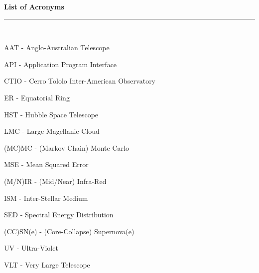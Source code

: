 \thispagestyle{empty}
\begin{raggedleft}
\vspace*{23mm}
\hfill {\huge {\bf {List of Acronyms}}} \\
\vspace{6mm}
\hfill \rule{4in}{.015in} \\
\vspace{19mm}
\end{raggedleft}




%
%

AAT - Anglo-Australian Telescope

API - Application Program Interface

CTIO - Cerro Tololo Inter-American Observatory

ER - Equatorial Ring

HST - Hubble Space Telescope

LMC - Large Magellanic Cloud

(MC)MC - (Markov Chain) Monte Carlo

MSE - Mean Squared Error

(M/N)IR - (Mid/Near) Infra-Red 

ISM - Inter-Stellar Medium

SED - Spectral Energy Distribution

(CC)SN(e) - (Core-Collapse) Supernova(e)

UV - Ultra-Violet

VLT - Very Large Telescope
